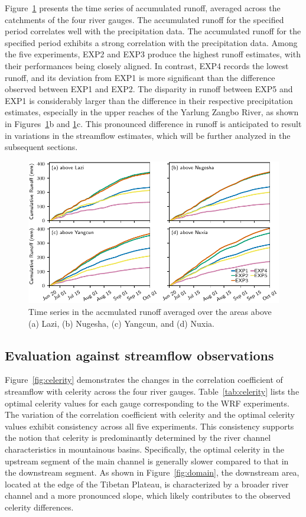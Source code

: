 \documentclass[draft]{agujournal2019}
\begin{document}
Figure~\ref{fig:rncumupts} presents the time series of accumulated runoff, averaged across the catchments of the four river gauges. The accumulated runoff for the specified period correlates well with the precipitation data. The accumulated runoff for the specified period exhibits a strong correlation with the precipitation data. Among the five experiments, EXP2 and EXP3 produce the highest runoff estimates, with their performances being closely aligned. In contrast, EXP4 records the lowest runoff, and its deviation from EXP1 is more significant than the difference observed between EXP1 and EXP2. The disparity in runoff between EXP5 and EXP1 is considerably larger than the difference in their respective precipitation estimates, especially in the upper reaches of the Yarlung Zangbo River, as shown in Figures~\ref{fig:rncumupts}b and \ref{fig:rncumupts}c. This pronounced difference in runoff is anticipated to result in variations in the streamflow estimates, which will be further analyzed in the subsequent sections.

\begin{figure}[h!]
      \centering
      \noindent\includegraphics[width=140mm]{prrn_rncumupts.pdf}
      \caption{Time series in the accmulated runoff averaged over the areas above (a) Lazi, (b) Nugesha, (c) Yangcun, and (d) Nuxia. \label{fig:rncumupts}}
\end{figure}

\subsection{Evaluation against streamflow observations}

Figure~\ref{fig:celerity} demonstrates the changes in the correlation coefficient of streamflow with celerity across the four river gauges. Table~\ref{tab:celerity} lists the optimal celerity values for each gauge corresponding to the WRF experiments. The variation of the correlation coefficient with celerity and the optimal celerity values exhibit consistency across all five experiments. This consistency supports the notion that celerity is predominantly determined by the river channel characteristics in mountainous basins. Specifically, the optimal celerity in the upstream segment of the main channel is generally slower compared to that in the downstream segment. As shown in Figure~\ref{fig:domain}, the downstream area, located at the edge of the Tibetan Plateau, is characterized by a broader river channel and a more pronounced slope, which likely contributes to the observed celerity differences.
\end{document}
